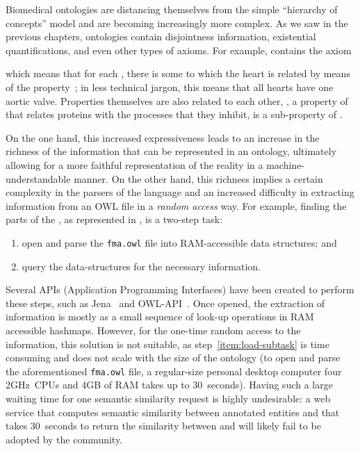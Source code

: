 Biomedical ontologies are distancing themselves from the simple ``hierarchy of concepts'' model and are becoming increasingly more complex. As we saw in the previous chapters, ontologies contain disjointness information, existential quantifications, and even other types of axioms. For example,  contains the axiom
\begin{axiom}
\end{axiom}
which means that for each , there is some  to which the heart is related by means of the property~; in less technical jargon, this means that all hearts have one aortic valve. Properties themselves are also related to each other, \eg {}, a property of  that relates proteins with the processes that they inhibit, is a sub-property of .

On the one hand, this increased expressiveness leads to an increase in the richness of the information that can be represented in an ontology, ultimately allowing for a more faithful representation of the reality in a machine-understandable manner. On the other hand, this richness implies a certain complexity in the parsers of the language and an increased difficulty in extracting information from an OWL file in a \emph{random access} way. For example, finding the parts of the , as represented in , is a two-step task:
\begin{enumerate}
    \item \label{item:load-subtask} open and parse the \nolinkurl{fma.owl} file into RAM-accessible data structures; and
    \item query the data-structures for the necessary information.
\end{enumerate}

Several APIs (Application Programming Interfaces) have been created to perform these steps, such as Jena~\citep{Carroll2004} and OWL-API~\citep{Horridge2011}. Once opened, the extraction of information is mostly as a small sequence of look-up operations in RAM accessible hashmaps. However, for the one-time random access to the information, this solution is not suitable, as step~\ref{item:load-subtask} is time consuming and does not scale with the size of the ontology (to open and parse the aforementioned \nolinkurl{fma.owl} file, a regular-size personal desktop computer \mdash four 2GHz~CPUs and 4GB of RAM \mdash takes up to $30$~seconds). Having such a large waiting time for one semantic similarity request is highly undesirable: \eg a web service that computes semantic similarity between annotated entities and that takes $30$~seconds to return the similarity between  and  will likely fail to be adopted by the community.

